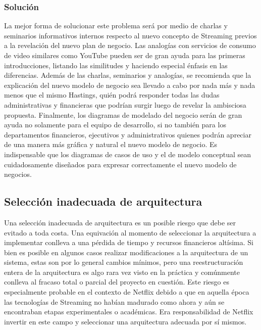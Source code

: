 \documentclass{article}
\begin{document}
\subsubsection{Solución}
La mejor forma de solucionar este problema será por medio de 
charlas y seminarios informativos internos respecto al nuevo 
concepto de Streaming previos a la revelación del nuevo plan de
negocio. Las analogías con servicios de consumo de video similares 
como YouTube pueden ser de gran ayuda para las primeras
introducciones, listando las similitudes y 
haciendo especial énfasis en las diferencias. Además de las charlas,
seminarios y analogías, se recomienda que la explicación del nuevo
modelo de negocio sea llevado a cabo por nada más y nada menos
que el mismo Hastings, quién podrá responder todas las dudas
administrativas y financieras que podrían surgir luego de revelar
la ambisciosa propuesta. Finalmente, los diagramas de modelado
del negocio serán de gran ayuda no solamente para el equipo de 
desarrollo, si no también para los departamentos financieros,
ejecutivos y administrativos quienes podrán apreciar de una manera
más gráfica y natural el nuevo modelo de negocio. Es indispensable
que los diagramas de casos de uso y el de modelo conceptual sean 
cuidadosamente diseñados para expresar correctamente el nuevo 
modelo de negocios.

\subsection{Selección inadecuada de arquitectura}
Una selección inadecuada de arquitectura es un posible riesgo que
debe ser evitado a toda costa. Una equivación al momento de
seleccionar la arquitectura a implementar conlleva a una pérdida
de tiempo y recursos financieros altísima. Si bien es posible en 
algunos casos realizar modificaciones a la arquitectura de un 
sistema, estas son por lo general cambios mínimos, pero una 
reestructuración entera de la arquitectura es algo rara vez visto
en la práctica y comúnmente conlleva al fracaso total o parcial
del proyecto en cuestión. Este riesgo es especialmente probable
en el contexto de Netflix debido a que en aquella época las 
tecnologías de Streaming no habían madurado como ahora y aún 
se encontraban etapas experimentales o académicas. Era responsabilidad
de Netflix invertir en este campo y seleccionar una arquitectura 
adecuada por sí mismos.
\end{document}
